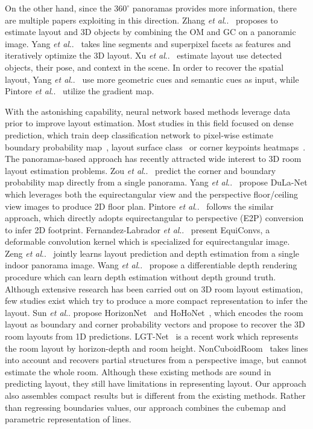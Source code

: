 \documentclass[runningheads]{llncs}
\makeatletter
\DeclareRobustCommand\onedot{\futurelet\@let@token\@onedot}
\def\@onedot{\ifx\@let@token.\else.\null\fi\xspace}
\def\etal{\emph{et al}\onedot}
\makeatother
\begin{document}
On the other hand, since the $360^\circ$ panoramas provides more information, there are multiple papers exploiting in this direction. Zhang \etal~\cite{zhang2014panocontext} proposes to estimate layout and 3D objects by combining the OM and GC on a panoramic image.
Yang \etal~\cite{yang2016efficient} takes line segments and superpixel facets as features and iteratively optimize the 3D layout.
Xu \etal~\cite{xu2017pano2cad} estimate layout use detected objects, their pose, and context in the scene.
In order to recover the spatial layout, Yang \etal~\cite{yang2018automatic} use more geometric cues and semantic cues as input, while Pintore \etal~\cite{pintore2016omnidirectional} utilize the gradient map.

With the astonishing capability, neural network based methods leverage data prior to improve layout estimation. Most studies in this field focused on dense prediction, which train deep classification network to pixel-wise estimate boundary probability map~\cite{mallya2015learning,ren2016coarse,zhao2017physics}, layout surface class~\cite{dasgupta2016delay,izadinia2017im2cad} or corner keypoints heatmaps~\cite{lee2017roomnet,fernandez2020corners}. 
The panoramas-based approach has recently attracted wide interest to 3D room layout estimation problems. Zou \etal~\cite{zou2018layoutnet} predict the corner and boundary probability map directly from a single panorama. Yang \etal~\cite{yang2019dula} propose DuLa-Net which leverages both the equirectangular view and the perspective floor/ceiling view images to produce 2D floor plan. Pintore \etal~\cite{pintore2020atlantanet} follows the similar approach, which directly adopts equirectangular to perspective (E2P) conversion to infer 2D footprint. Fernandez-Labrador \etal~\cite{fernandez2020corners} present EquiConvs, a deformable convolution kernel which is specialized for equirectangular image. Zeng \etal~\cite{zeng2020joint} jointly learns layout prediction and depth estimation from a single indoor panorama image. Wang \etal~\cite{Wang_2021_LED2Net} propose a differentiable depth rendering procedure which can learn depth estimation without depth ground truth.
Although extensive research has been carried out on 3D room layout estimation, few studies exist which try to produce a more compact representation to infer the layout. Sun \etal propose HorizonNet~\cite{sun2019horizonnet} and HoHoNet~\cite{Sun_2021_HoHoNet}, which encodes the room layout as boundary and corner probability vectors and propose to recover the 3D room layouts from 1D predictions. 
LGT-Net~\cite{jiang2022lgt} is a recent work which represents the room layout by horizon-depth and room height. NonCuboidRoom~\cite{yang2022learning} takes lines into account and recovers partial structures from a perspective image, but cannot estimate the whole room.
Although these existing methods are sound in predicting layout, they still have limitations in representing layout.
Our approach also assembles compact results but is different from the existing methods. Rather than regressing boundaries values, our approach combines the cubemap and parametric representation of lines.
\end{document}
